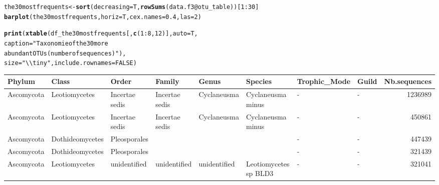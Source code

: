 \documentclass[12pt]{article}\usepackage[]{graphicx}\usepackage[]{color}
\makeatletter
\newcommand{\hlnum}[1]{\textcolor[rgb]{0.686,0.059,0.569}{#1}}%
\newcommand{\hlstr}[1]{\textcolor[rgb]{0.192,0.494,0.8}{#1}}%
\newcommand{\hlopt}[1]{\textcolor[rgb]{0,0,0}{#1}}%
\newcommand{\hlstd}[1]{\textcolor[rgb]{0.345,0.345,0.345}{#1}}%
\newcommand{\hlkwb}[1]{\textcolor[rgb]{0.69,0.353,0.396}{#1}}%
\newcommand{\hlkwc}[1]{\textcolor[rgb]{0.333,0.667,0.333}{#1}}%
\newcommand{\hlkwd}[1]{\textcolor[rgb]{0.737,0.353,0.396}{\textbf{#1}}}%
\newenvironment{kframe}{%
 \def\at@end@of@kframe{}%
 \ifinner\ifhmode%
  \def\at@end@of@kframe{\end{minipage}}%
  \begin{minipage}{\columnwidth}%
 \fi\fi%
 \def\FrameCommand##1{\hskip\@totalleftmargin \hskip-\fboxsep
 \colorbox{shadecolor}{##1}\hskip-\fboxsep
     \hskip-\linewidth \hskip-\@totalleftmargin \hskip\columnwidth}%
 \MakeFramed {\advance\hsize-\width
   \@totalleftmargin\z@ \linewidth\hsize
   \@setminipage}}%
 {\par\unskip\endMakeFramed%
 \at@end@of@kframe}
\newenvironment{knitrout}{}{} %
\numberwithin{figure}{section}
\makeatother
\begin{document}
\begin{knitrout}\small
{}\color{fgcolor}\begin{kframe}
\begin{alltt}
\hlstd{the30mostfrequents} \hlkwb{<-} \hlkwd{sort}\hlstd{(}\hlkwc{decreasing} \hlstd{= T,} \hlkwd{rowSums}\hlstd{(data.f3}\hlopt{@}\hlkwc{otu_table}\hlstd{))[}\hlnum{1}\hlopt{:}\hlnum{30}\hlstd{]}
\hlkwd{barplot}\hlstd{(the30mostfrequents,} \hlkwc{horiz} \hlstd{= T,} \hlkwc{cex.names} \hlstd{=} \hlnum{0.4}\hlstd{,} \hlkwc{las} \hlstd{=} \hlnum{2}\hlstd{)}
\end{alltt}
\end{kframe}
\end{knitrout}



\begin{landscape}
\begin{kframe}
\begin{alltt}
\hlkwd{print}\hlstd{(}\hlkwd{xtable}\hlstd{(df_the30mostfrequents[,} \hlkwd{c}\hlstd{(}\hlnum{1}\hlopt{:}\hlnum{8}\hlstd{,} \hlnum{12}\hlstd{)],} \hlkwc{auto} \hlstd{= T,}
             \hlkwc{caption} \hlstd{=} \hlstr{"Taxonomie of the 30 more
             abundant OTUs (number of sequences)"}\hlstd{),}
      \hlkwc{size} \hlstd{=} \hlstr{"\textbackslash{}\textbackslash{}tiny"}\hlstd{,} \hlkwc{include.rownames} \hlstd{=} \hlnum{FALSE}\hlstd{)}
\end{alltt}
\end{kframe}%
\begin{table}[ht]
\centering
\begingroup\tiny
\begin{tabular}{llllllllr}
  \hline
Phylum & Class & Order & Family & Genus & Species & Trophic\_Mode & Guild & Nb.sequences \\ 
  \hline
Ascomycota & Leotiomycetes & Incertae sedis & Incertae sedis & Cyclaneusma & Cyclaneusma minus & - & - & 1236989 \\ 
  Ascomycota & Leotiomycetes & Incertae sedis & Incertae sedis & Cyclaneusma & Cyclaneusma minus & - & - & 450861 \\ 
  Ascomycota & Dothideomycetes & Pleosporales &  &  &  & - & - & 447439 \\ 
  Ascomycota & Dothideomycetes & Pleosporales &  &  &  & - & - & 321439 \\ 
  Ascomycota & Leotiomycetes & unidentified & unidentified & unidentified & Leotiomycetes sp BLD3 & - & - & 321041 \\ 

\end{tabular}
\end{table}
\end{landscape}
\end{document}
